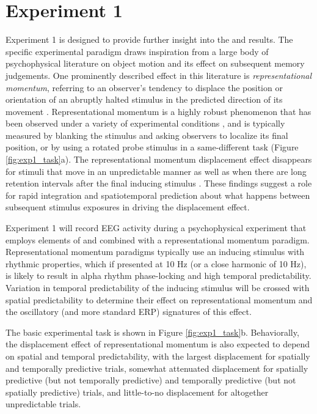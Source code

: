 \documentclass[defaultstyle,12pt]{thesis}
\begin{document}
{\section{Experiment 1}
Experiment 1 is designed to provide further insight into the  and  results. The specific experimental paradigm draws inspiration from a large body of psychophysical literature on object motion and its effect on subsequent memory judgements. One prominently described effect in this literature is \textit{representational momentum}, referring to an observer's tendency to displace the position or orientation of an abruptly halted stimulus in the predicted direction of its movement \cite{FreydFinke84}. Representational momentum is a highly robust phenomenon that has been observed under a variety of experimental conditions \cite{Hubbard05}, and is typically measured by blanking the stimulus and asking observers to localize its final position, or by using a rotated probe stimulus in a same-different task (Figure \ref{fig:exp1_task}a). The representational momentum displacement effect disappears for stimuli that move in an unpredictable manner \cite{Kerzel02} as well as when there are long retention intervals after the final inducing stimulus \cite{FreydJohnson87}. These findings suggest a role for rapid integration and spatiotemporal prediction about what happens between subsequent stimulus exposures in driving the displacement effect. 

Experiment 1 will record EEG activity during a psychophysical experiment that employs elements of  and  combined with a representational momentum paradigm. Representational momentum paradigms typically use an inducing stimulus with rhythmic properties, which if presented at 10 Hz (or a close harmonic of 10 Hz), is likely to result in alpha rhythm phase-locking and high temporal predictability. Variation in temporal predictability of the inducing stimulus will be crossed with spatial predictability to determine their effect on representational momentum and the oscillatory (and more standard ERP) signatures of this effect.

The basic experimental task is shown in Figure \ref{fig:exp1_task}b. Behaviorally, the displacement effect of representational momentum is also expected to depend on spatial and temporal predictability, with the largest displacement for spatially and temporally predictive trials, somewhat attenuated displacement for spatially predictive (but not temporally predictive) and temporally predictive (but not spatially predictive) trials, and little-to-no displacement for altogether unpredictable trials.

}
\end{document}
